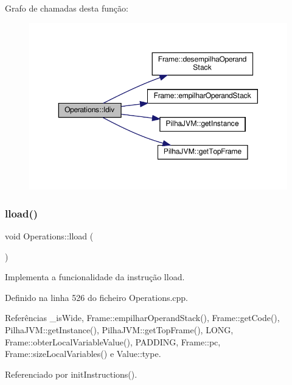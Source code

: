 Grafo de chamadas desta função\+:\nopagebreak
\begin{figure}[H]
\begin{center}
\leavevmode
\includegraphics[width=350pt]{classOperations_ab9bb90a9db0433e1d04b0eb9bceea9f4_cgraph}
\end{center}
\end{figure}
\mbox{\label{classOperations_abd9d44b782cc5ae7d7985a424a0985c6}} 
\subsubsection{\texorpdfstring{lload()}{lload()}}
{\footnotesize\ttfamily void Operations\+::lload (\begin{DoxyParamCaption}{ }\end{DoxyParamCaption})\hspace{0.3cm}{\ttfamily [private]}}



Implementa a funcionalidade da instrução lload. 



Definido na linha 526 do ficheiro Operations.\+cpp.



Referências \+\_\+is\+Wide, Frame\+::empilhar\+Operand\+Stack(), Frame\+::get\+Code(), Pilha\+J\+V\+M\+::get\+Instance(), Pilha\+J\+V\+M\+::get\+Top\+Frame(), L\+O\+NG, Frame\+::obter\+Local\+Variable\+Value(), P\+A\+D\+D\+I\+NG, Frame\+::pc, Frame\+::size\+Local\+Variables() e Value\+::type.



Referenciado por init\+Instructions().

